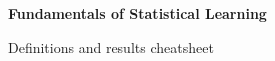\documentclass[12pt,a4paper,oneside]{report}
\begin{document}
\thispagestyle{notescontents}
\begin{center}
  {\Large\bfseries Fundamentals of Statistical Learning}\par
  \smallskip
  {\large Definitions and results cheatsheet}
\end{center}

\setcounter{chapter}{-1}

\end{document}
